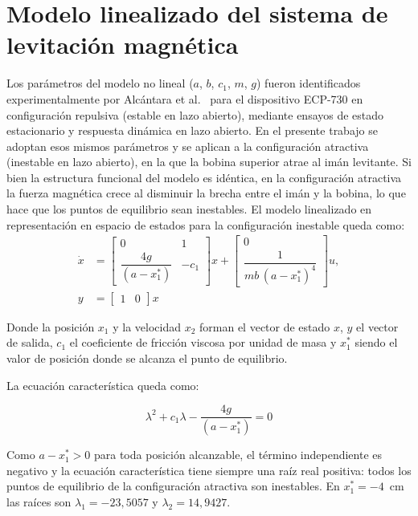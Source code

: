 \section{Modelo linealizado del sistema de levitación magnética}
Los parámetros del modelo no lineal ($a$, $b$, $c_1$, $m$, $g$) fueron identificados experimentalmente por Alcántara et al.\ \cite{diana_tesis} para el dispositivo ECP-730 en configuración repulsiva (estable en lazo abierto), mediante ensayos de estado estacionario y respuesta dinámica en lazo abierto. En el presente trabajo se adoptan esos mismos parámetros y se aplican a la configuración atractiva (inestable en lazo abierto), en la que la bobina superior atrae al imán levitante. Si bien la estructura funcional del modelo es idéntica, en la configuración atractiva la fuerza magnética crece al disminuir la brecha entre el imán y la bobina, lo que hace que los puntos de equilibrio sean inestables. El modelo linealizado en representación en espacio de estados para la configuración inestable queda como:
\[
\begin{aligned}
\dot{x}
&=
\begin{bmatrix}
0 & 1 \\[6pt]
\dfrac{4g}{(a-x_1^{\ast})} & -c_1
\end{bmatrix}x
+
\begin{bmatrix}
0 \\[6pt]
\dfrac{1}{mb\,(a-x_1^{\ast})^4}
\end{bmatrix}u,
\\[10pt]
y &= \begin{bmatrix} 1 & 0 \end{bmatrix} x
\end{aligned}
\]


Donde la posición $x_1$ y la velocidad $x_2$ forman el vector de estado $x$, $y$ el vector de salida, $c_1$ el coeficiente de fricción viscosa por unidad de masa y $x_1^{\ast}$ siendo el valor de posición donde se alcanza el punto de equilibrio.

La ecuación característica queda como:

\[
\lambda^2 + c_1\lambda - \dfrac{4g}{(a-x_1^{\ast})} = 0
\]

Como $a - x_1^{\ast} > 0$ para toda posición alcanzable, el término independiente es negativo y la ecuación característica tiene siempre una raíz real positiva: todos los puntos de equilibrio de la configuración atractiva son inestables. En $x_1^{\ast}=-4$~cm las raíces son $\lambda_1 = -23{,}5057$ y $\lambda_2 = 14{,}9427$.

